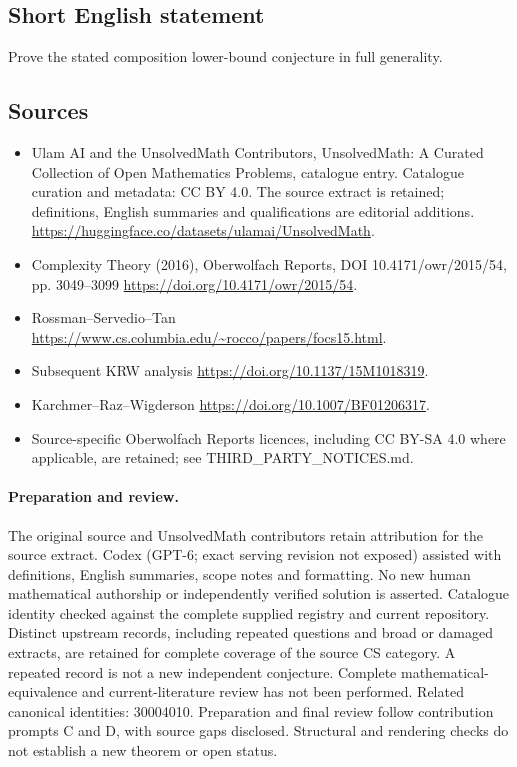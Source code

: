 \documentclass[11pt]{article}
\begin{document}
\subsection{Short English statement}
Prove the stated composition lower-bound conjecture in full generality.
\subsection{Sources}
\begin{itemize}
\item[\hypertarget{source:statement:1}{S1}] Ulam AI and the UnsolvedMath Contributors, UnsolvedMath: A Curated Collection of Open Mathematics Problems, catalogue entry. Catalogue curation and metadata: CC BY 4.0. The source extract is retained; definitions, English summaries and qualifications are editorial additions.
\url{https://huggingface.co/datasets/ulamai/UnsolvedMath}.
\item[\hypertarget{source:statement:2}{S2}] Complexity Theory (2016), Oberwolfach Reports, DOI 10.4171/owr/2015/54, pp. 3049--3099
\url{https://doi.org/10.4171/owr/2015/54}.
\item[\hypertarget{source:statement:3}{S3}] Rossman--Servedio--Tan
\url{https://www.cs.columbia.edu/~rocco/papers/focs15.html}.
\item[\hypertarget{source:statement:4}{S4}] Subsequent KRW analysis
\url{https://doi.org/10.1137/15M1018319}.
\item[\hypertarget{source:statement:5}{S5}] Karchmer--Raz--Wigderson
\url{https://doi.org/10.1007/BF01206317}.
\item Source-specific Oberwolfach Reports licences, including CC BY-SA 4.0 where applicable, are retained; see THIRD\_PARTY\_NOTICES.md.
\end{itemize}
\paragraph{Preparation and review.}
The original source and UnsolvedMath contributors retain attribution for the source extract. Codex (GPT-6; exact serving revision not exposed) assisted with definitions, English summaries, scope notes and formatting. No new human mathematical authorship or independently verified solution is asserted. Catalogue identity checked against the complete supplied registry and current repository. Distinct upstream records, including repeated questions and broad or damaged extracts, are retained for complete coverage of the source CS category. A repeated record is not a new independent conjecture. Complete mathematical-equivalence and current-literature review has not been performed. Related canonical identities: 30004010. Preparation and final review follow contribution prompts C and D, with source gaps disclosed. Structural and rendering checks do not establish a new theorem or open status.
\label{end:statement}
\end{document}
